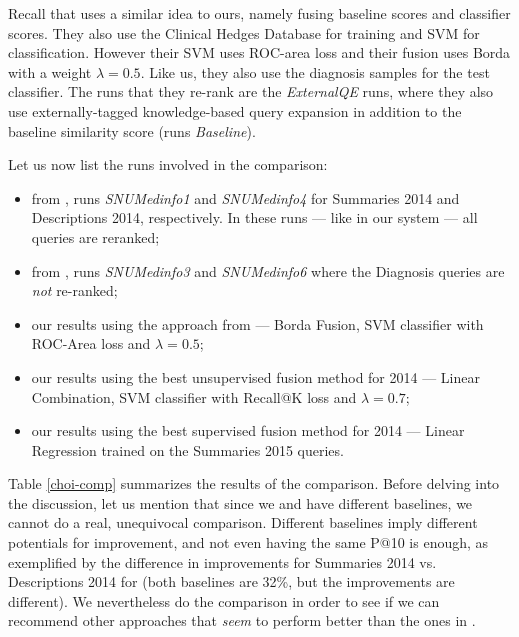 Recall that \cite{choi} uses a similar idea to ours, namely fusing baseline scores and
classifier scores. They also use the Clinical Hedges Database for training and SVM for classification.
However their SVM uses ROC-area loss and their fusion uses Borda with a weight $\lambda=0.5$.
Like us, they also use the diagnosis samples for the test classifier.
The runs that they re-rank are the \emph{ExternalQE} runs, where
they also use externally-tagged knowledge-based query expansion in addition to the baseline similarity score
(runs \emph{Baseline}).

Let us now list the runs involved in the comparison:
\begin{itemize}
 \item from \cite{choi}, runs \emph{SNUMedinfo1} and \emph{SNUMedinfo4} for Summaries 2014 and Descriptions 2014, respectively.
  In these runs --- like in our system --- all queries are reranked;
 \item from \cite{choi}, runs \emph{SNUMedinfo3} and \emph{SNUMedinfo6} where the Diagnosis queries are \emph{not} re-ranked;
 \item our results using the approach from \cite{choi} --- Borda Fusion, SVM classifier with ROC-Area loss and $\lambda=0.5$;
 \item our results using the best unsupervised fusion method for 2014 --- Linear Combination, SVM classifier with Recall@K loss and $\lambda=0.7$;
 \item our results using the best supervised fusion method for 2014 --- Linear Regression trained on the Summaries 2015 queries.
\end{itemize}

Table \ref{choi-comp} summarizes the results of the comparison.
Before delving into the discussion, let us mention that since we and \cite{choi} have different baselines,
we cannot do a real, unequivocal comparison. Different baselines imply different potentials for improvement, and
not even having the same P@10 is enough, as exemplified by the difference in improvements for Summaries
2014 vs. Descriptions 2014 for \cite{choi} (both baselines are 32\%, but the improvements are different).
We nevertheless do the comparison in order to see if we can recommend other approaches that \emph{seem}
to perform better than the ones in \cite{choi}.

